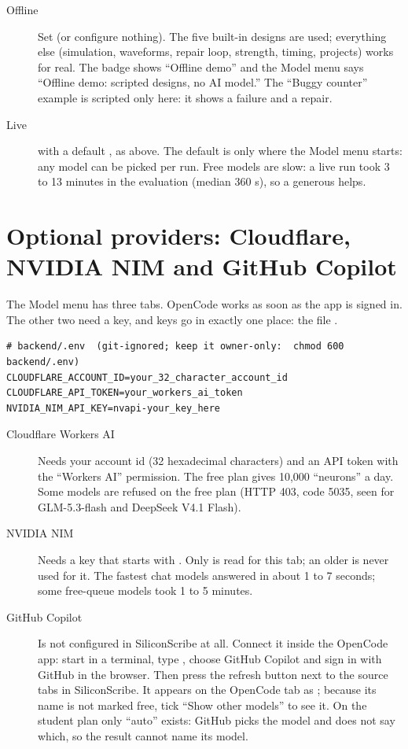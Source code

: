 \begin{description}
  \item[Offline] Set  (or configure nothing). The five built-in designs are used; everything else (simulation, waveforms, repair loop, strength, timing, projects) works for real. The badge shows ``Offline demo'' and the Model menu says ``Offline demo: scripted designs, no AI model.'' The ``Buggy counter'' example is scripted only here: it shows a failure and a repair.
  \item[Live]  with a default , as above. The default is only where the Model menu starts: any model can be picked per run. Free models are slow: a live run took 3 to 13 minutes in the evaluation (median 360 s), so a generous  helps.
\end{description}

\section{Optional providers: Cloudflare, NVIDIA NIM and GitHub Copilot}
\label{sec:providers}

The Model menu has three tabs. OpenCode works as soon as the app is signed in. The other two need a key, and keys go in exactly one place: the file .

\begin{lstlisting}[style=plain]
# backend/.env  (git-ignored; keep it owner-only:  chmod 600 backend/.env)
CLOUDFLARE_ACCOUNT_ID=your_32_character_account_id
CLOUDFLARE_API_TOKEN=your_workers_ai_token
NVIDIA_NIM_API_KEY=nvapi-your_key_here
\end{lstlisting}

\begin{description}
  \item[Cloudflare Workers AI] Needs your account id (32 hexadecimal characters) and an API token with the ``Workers AI'' permission. The free plan gives 10,000 ``neurons'' a day. Some models are refused on the free plan (HTTP 403, code 5035, seen for GLM-5.3-flash and DeepSeek V4.1 Flash).
  \item[NVIDIA NIM] Needs a key that starts with . Only  is read for this tab; an older  is never used for it. The fastest chat models answered in about 1 to 7 seconds; some free-queue models took 1 to 5 minutes.
  \item[GitHub Copilot] Is not configured in SiliconScribe at all. Connect it inside the OpenCode app: start  in a terminal, type , choose GitHub Copilot and sign in with GitHub in the browser. Then press the refresh button next to the source tabs in SiliconScribe. It appears on the OpenCode tab as ; because its name is not marked free, tick ``Show other models'' to see it. On the student plan only ``auto'' exists: GitHub picks the model and does not say which, so the result cannot name its model.
\end{description}


